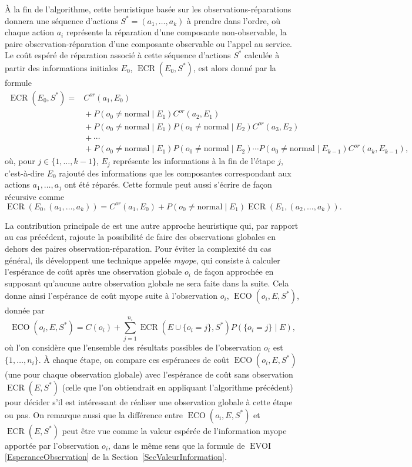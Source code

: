 \documentclass[a4paper,11pt]{article}
\theoremstyle{plain}
\theoremstyle{definition}
\DeclareMathOperator{\ECO}{ECO}
\DeclareMathOperator{\ECR}{ECR}
\DeclareMathOperator{\EVOI}{EVOI}
\begin{document}
À la fin de l'algorithme, cette heuristique basée sur les observations-réparations donnera une séquence d'actions $S^\ast = (a_1, \dotsc, a_k)$ à prendre dans l'ordre, où chaque action $a_i$ représente la réparation d'une composante non-observable, la paire observation-réparation d'une composante observable ou l'appel au service. Le coût espéré de réparation associé à cette séquence d'actions $S^\ast$ calculée à partir des informations initiales $E_0$, $\ECR(E_0, S^\ast)$, est alors donné par la formule
\begin{equation}
\label{EqECR}
\begin{aligned}
\ECR(E_0, S^\ast) = {} & C^{or}(a_1, E_0) \\
& {} + P(o_0 \neq \text{normal} \mid E_1) C^{or}(a_2, E_1) \\
& {} + P(o_0 \neq \text{normal} \mid E_1) P(o_0 \neq \text{normal} \mid E_2) C^{or}(a_3, E_2) \\
& {} + \dotsb \\
& {} + P(o_0 \neq \text{normal} \mid E_1) P(o_0 \neq \text{normal} \mid E_2) \dotsm P(o_0 \neq \text{normal} \mid E_{k-1}) C^{or}(a_k, E_{k-1}),
\end{aligned}
\end{equation}
où, pour $j \in \{1, \dotsc, k-1\}$, $E_j$ représente les informations à la fin de l'étape $j$, c'est-à-dire $E_0$ rajouté des informations que les composantes correspondant aux actions $a_1, \dotsc, a_j$ ont été réparés. Cette formule peut aussi s'écrire de façon récursive comme
\[
\ECR(E_0, (a_1, \dotsc, a_k)) = C^{or}(a_1, E_0) + P(o_0 \neq \text{normal} \mid E_1) \ECR(E_1, (a_2, \dotsc, a_k)).
\]

La contribution principale de \cite{heckerman1994troubleshooting, Heckerman_1995} est une autre approche heuristique qui, par rapport au cas précédent, rajoute la possibilité de faire des observations globales en dehors des paires ob\-ser\-va\-tion-ré\-pa\-ra\-tion. Pour éviter la complexité du cas général, ils développent une technique appelée \emph{myope}, qui consiste à calculer l'espérance de coût après une observation globale $o_i$ de façon approchée en supposant qu'aucune autre observation globale ne sera faite dans la suite. Cela donne ainsi l'espérance de coût myope suite à l'observation $o_i$, $\ECO(o_i, E, S^\ast)$, donnée par
\[
\ECO(o_i, E, S^\ast) = C(o_i) + \sum_{j=1}^{n_i} \ECR(E \cup \{o_i = j\}, S^\ast) P(\{o_i = j\} \mid E),
\]
où l'on considère que l'ensemble des résultats possibles de l'observation $o_i$ est $\{1, \dotsc, n_i\}$. À chaque étape, on compare ces espérances de coût $\ECO(o_i, E, S^\ast)$ (une pour chaque observation globale) avec l'espérance de coût sans observation $\ECR(E, S^\ast)$ (celle que l'on obtiendrait en appliquant l'algorithme précédent) pour décider s'il est intéressant de réaliser une observation globale à cette étape ou pas. On remarque aussi que la différence entre $\ECO(o_i, E, S^\ast)$ et $\ECR(E, S^\ast)$ peut être vue comme la valeur espérée de l'information myope apportée par l'observation $o_i$, dans le même sens que la formule de $\EVOI$ \eqref{EsperanceObservation} de la Section~\ref{SecValeurInformation}.
\end{document}
